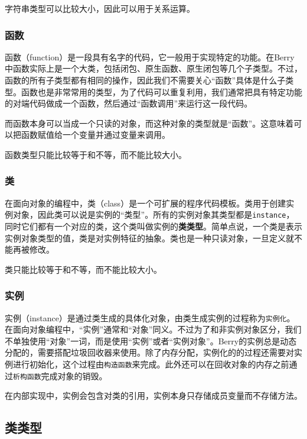 字符串类型可以比较大小，因此可以用于关系运算。

\subsubsection{函数}

函数（function）是一段具有名字的代码，它一般用于实现特定的功能。在Berry中函数实际上是一个大类，包括闭包、原生函数、原生闭包等几个子类型。不过，函数的所有子类型都有相同的操作，因此我们不需要关心``函数''具体是什么子类型。函数也是非常常用的类型，为了代码可以重复利用，我们通常把具有特定功能的对端代码做成一个函数，然后通过``函数调用''来运行这一段代码。

而函数本身可以当成一个只读的对象，而这种对象的类型就是``函数''。这意味着可以把函数赋值给一个变量并通过变量来调用。

函数类型只能比较等于和不等，而不能比较大小。

\subsubsection{类}

在面向对象的编程中，类（class）是一个可扩展的程序代码模板。类用于创建实例对象，因此类可以说是实例的``类型''。所有的实例对象其类型都是\texttt{instance}，同时它们都有一个对应的类，这个类叫做实例的\textbf{类类型}。简单点说，一个类是表示实例对象类型的值，类是对实例特征的抽象。类也是一种只读对象，一旦定义就不能再被修改。

类只能比较等于和不等，而不能比较大小。

\subsubsection{实例}

实例（instance）是通过类生成的具体化对象，由类生成实例的过程称为\texttt{实例化}。在面向对象编程中，``实例''通常和``对象''同义。不过为了和非实例对象区分，我们不单独使用``对象''一词，而是使用``实例''或者``实例对象''。Berry的实例总是动态分配的，需要搭配垃圾回收器来使用。除了内存分配，实例化的的过程还需要对实例进行初始化，这个过程由\texttt{构造函数}来完成。此外还可以在回收对象的内存之前通过\texttt{析构函数}完成对象的销毁。

在内部实现中，实例会包含对类的引用，实例本身只存储成员变量而不存储方法。

\subsection{类类型}

